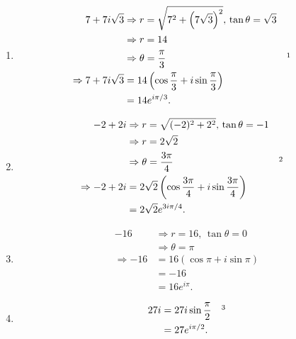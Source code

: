 \documentclass{tufte-handout}
\begin{document}
\begin{enumerate}[label=(\alph*)]
\item
  \begin{align*}
    7 + 7i\sqrt{3} &\Rightarrow r=\sqrt{7^2 +
                     {\left(7\sqrt{3}\right)}^2}, \, \tan\theta =
                     \sqrt{3}\\
                   &\Rightarrow r = 14\\
                   &\Rightarrow \theta = {\pi \over 3} && \footnotemark\\
    \Rightarrow 7 + 7i\sqrt{3} &= 14\left(\cos{\pi \over 3} +
                                 i\sin{\pi \over 3}\right)\\
                                 &= 14e^{i\pi / 3}.
  \end{align*}

\item
  \begin{align*}
    -2 + 2i &\Rightarrow r = \sqrt{(-2)^2 + 2^2}, \, \tan \theta =
              -1\\
            &\Rightarrow r = 2 \sqrt 2\\
            &\Rightarrow \theta = {3\pi \over 4} && \footnotemark\\
    \Rightarrow -2 + 2i &= 2\sqrt2 \left(\cos{3\pi \over 4} +
                          i\sin{3\pi \over 4}\right)\\
            &= 2\sqrt2 e^{3i\pi / 4}.
  \end{align*}

\item
  \begin{align*}
    -16 &\Rightarrow r = 16, \, \tan \theta = 0\\
        &\Rightarrow \theta = \pi\\
    \Rightarrow -16 &= 16(\cos \pi + i\sin \pi)\\
        &= -16\\
        &= 16e^{i\pi}.
  \end{align*}

\item
  \begin{align*}
    27i &= 27i \sin {\pi \over 2} && \footnotemark\\
        &= 27e^{i\pi / 2}.
  \end{align*}
\end{enumerate}
\end{document}
